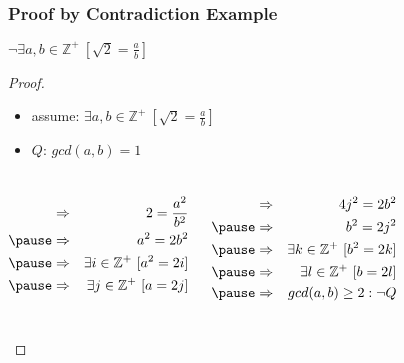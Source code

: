 \documentclass[dvipsnames]{beamer}
\begin{document}
\begin{frame}
  \frametitle{Proof by Contradiction Example}

  \begin{theorem}
    $\neg \exists a,b \in \mathbb{Z}^+~[\sqrt{2}=\frac{a}{b}]$
  \end{theorem}

  \pause
  \begin{proof}
    \begin{itemize}
      \item assume: $\exists a,b \in \mathbb{Z}^+~[\sqrt{2}=\frac{a}{b}]$
      \item $Q$: $gcd(a,b)=1$
    \end{itemize}

    \pause
    \vspace{-0.7cm}
    \begin{columns}[t]
      \begin{eqnarray*}
        & \Rightarrow & 2 = \frac{a^2}{b^2}\\\pause
        & \Rightarrow & a^2 = 2b^2\\\pause
        & \Rightarrow & \exists i \in \mathbb{Z}^+~[a^2=2i]\\\pause
        & \Rightarrow & \exists j \in \mathbb{Z}^+~[a=2j]
      \end{eqnarray*}

      \pause
      \begin{eqnarray*}
        & \Rightarrow & 4j^2 = 2b^2\\\pause
        & \Rightarrow & b^2 = 2j^2\\\pause
        & \Rightarrow & \exists k \in \mathbb{Z}^+~[b^2=2k]\\\pause
        & \Rightarrow & \exists l \in \mathbb{Z}^+~[b=2l]\\\pause
        & \Rightarrow & gcd(a,b) \geq 2: \neg Q
      \end{eqnarray*}
    \end{columns}
  \end{proof}
\end{frame}
\end{document}
